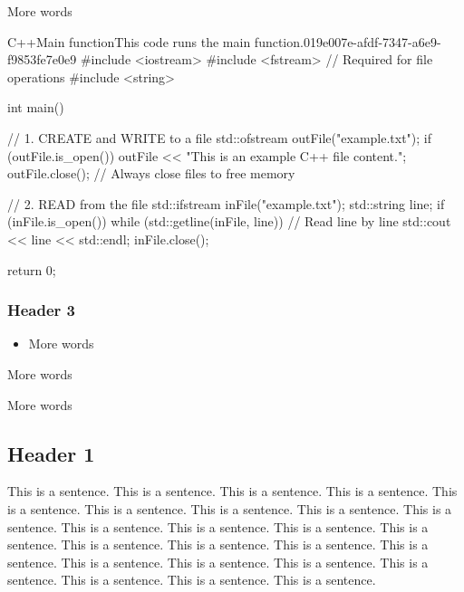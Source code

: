 More words

\begin{notebookcodeblock}{C++}{Main function}{This code runs the main function.}{019e007e-afdf-7347-a6e9-f9853fe7e0e9}
#include <iostream>
#include <fstream> // Required for file operations
#include <string>

int main() {
    // 1. CREATE and WRITE to a file
    std::ofstream outFile("example.txt"); 
    if (outFile.is_open()) {
        outFile << "This is an example C++ file content.\n";
        outFile.close(); // Always close files to free memory
    }

    // 2. READ from the file
    std::ifstream inFile("example.txt");
    std::string line;
    if (inFile.is_open()) {
        while (std::getline(inFile, line)) { // Read line by line
            std::cout << line << std::endl;
        }
        inFile.close();
    }

    return 0;
}
\end{notebookcodeblock}

\subsubsection{Header 3}

\begin{itemize}
  \item More words
\end{itemize}


More words


More words

\subsection{Header 1}

This is a sentence. This is a sentence. This is a sentence. This is a sentence. This is a sentence. This is a sentence. This is a sentence. This is a sentence. This is a sentence. This is a sentence. This is a sentence. This is a sentence. This is a sentence. This is a sentence. This is a sentence. This is a sentence. This is a sentence. This is a sentence. This is a sentence. This is a sentence. This is a sentence. This is a sentence. This is a sentence. This is a sentence.


